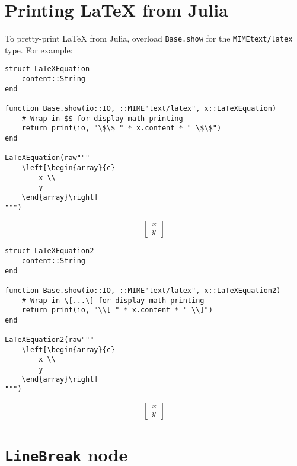 \section{Printing LaTeX from Julia}



\label{10914504187442884412}{}


To pretty-print LaTeX from Julia, overload \texttt{Base.show} for the \texttt{MIME{\textquotedbl}text/latex{\textquotedbl}} type. For example:




\begin{verbatim}
struct LaTeXEquation
    content::String
end

function Base.show(io::IO, ::MIME"text/latex", x::LaTeXEquation)
    # Wrap in $$ for display math printing
    return print(io, "\$\$ " * x.content * " \$\$")
end

LaTeXEquation(raw"""
    \left[\begin{array}{c}
        x \\
        y
    \end{array}\right]
""")
\end{verbatim}

$$     \left[\begin{array}{c}
        x \\
        y
    \end{array}\right]
 $$


\begin{verbatim}
struct LaTeXEquation2
    content::String
end

function Base.show(io::IO, ::MIME"text/latex", x::LaTeXEquation2)
    # Wrap in \[...\] for display math printing
    return print(io, "\\[ " * x.content * " \\]")
end

LaTeXEquation2(raw"""
    \left[\begin{array}{c}
        x \\
        y
    \end{array}\right]
""")
\end{verbatim}

\[     \left[\begin{array}{c}
        x \\
        y
    \end{array}\right]
 \]

\section{\texttt{LineBreak} node}



